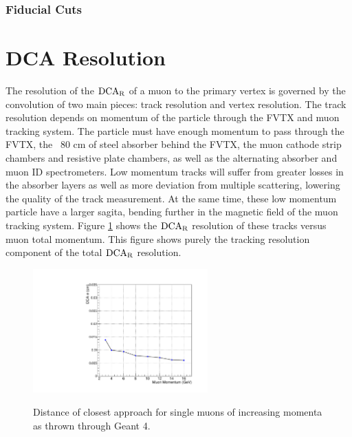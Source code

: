 \documentclass[12pt]{article}
\newcommand{\dcar}{$\rm{DCA}_{R}$ }
\begin{document}
\subsubsection{Fiducial Cuts}
\label{sec:fiducial cuts}



\section{DCA Resolution}
\label{sec:DCA}

The resolution of the \dcar of a muon to the primary vertex is governed by the convolution of two main pieces: track resolution and vertex resolution.
The track resolution depends on momentum of the particle through the FVTX and muon tracking system.  The particle must have enough momentum to pass through 
the FVTX, the ~80 cm of steel absorber behind the FVTX, the muon cathode strip chambers and resistive plate chambers, as well as the alternating absorber and muon ID
spectrometers.  Low momentum tracks will suffer from greater losses in the absorber layers as well as more deviation from multiple scattering, lowering the quality of the track
measurement.  At the same time, these low momentum particle have a larger sagita, bending further in the magnetic field of the muon tracking system.  Figure \ref{fig:MuonTrackDCA}
shows the \dcar resolution of these tracks versus muon total momentum. This figure shows purely the tracking resolution component of the total \dcar resolution.

\begin{figure}[h]
\begin{center}
\includegraphics[width=0.6\textwidth,angle=0]{figures/SingleMuon_SigmaVMomentum}
\\ \caption{Distance of closest approach for single muons of increasing momenta as thrown through Geant 4.}
\label{fig:MuonTrackDCA}
\end{center}
\end{figure}
\end{document}
